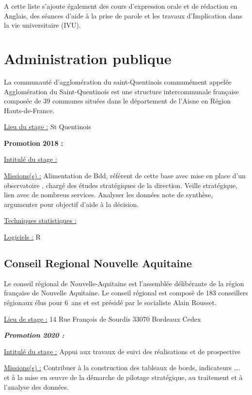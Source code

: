 \documentclass[
  letterpaper,
  DIV=11,
  numbers=noendperiod]{scrreprt}
\begin{document}
A cette liste s'ajoute également des cours d'expression orale et de
rédaction en Anglais, des séances d'aide à la prise de parole et les
travaux d'Implication dans la vie universitaire (IVU).


\hypertarget{administration-publique}{%
\chapter{Administration publique}\label{administration-publique}}

La communauté d'agglomération du saint-Quentinois communément appelée
Agglomération du Saint-Quentinois est une structure intercommunale
française composée de 39 communes situées dans le département de l'Aisne
en Région Hauts-de-France.

\uline{Lieu du stage :} St Quentinois

\textbf{Promotion 2018 :}

\uline{Intitulé du stage :}

\uline{Missions(s) :} Alimentation de Bdd, référent de cette base avec
mise en place d'un observatoire , chargé des études stratégiques de la
direction. Veille stratégique, lien avec de nombreus services. Analyser
les données note de synthèse, argumenter pour objectif d'aide à la
décision.

\uline{Techniques statistiques :}

\uline{Logiciels :} R

\hypertarget{conseil-regional-nouvelle-aquitaine}{%
\section{\texorpdfstring{\textbf{Conseil Regional Nouvelle
Aquitaine}}{Conseil Regional Nouvelle Aquitaine}}\label{conseil-regional-nouvelle-aquitaine}}

Le conseil régional de Nouvelle-Aquitaine est l'assemblée délibérante de
la région française de Nouvelle Aquitaine. Le conseil régional est
composé de 183 conseillers régionaux élus pour 6~ans et est présidé par
le socialiste Alain Rousset.

\uline{Lieu de stage :} 14 Rue François de Sourdis 33070 Bordeaux Cedex

\textbf{\emph{Promotion 2020 :}}

\uline{Intitulé du stage :} Appui aux travaux de suivi des réalisations
et de prospective

\uline{Missions(s) :} Contribuer à la construction des tableaux de
bords, indicateurs \ldots. et à la mise en œuvre de la démarche de
pilotage stratégique, au traitement et à l'analyse des données.
\end{document}
